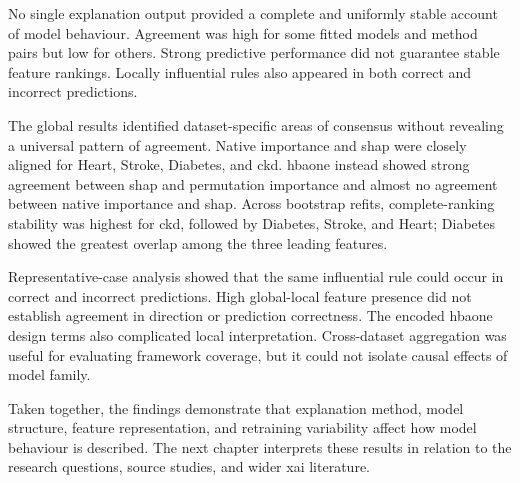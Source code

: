 No single explanation output provided a complete and uniformly stable account of model behaviour. Agreement was high for some fitted models and method pairs but low for others. Strong predictive performance did not guarantee stable feature rankings. Locally influential rules also appeared in both correct and incorrect predictions.

The global results identified dataset-specific areas of consensus without revealing a universal pattern of agreement. Native importance and \gls{shap} were closely aligned for Heart, Stroke, Diabetes, and \gls{ckd}. \gls{hbaone} instead showed strong agreement between \gls{shap} and permutation importance and almost no agreement between native importance and \gls{shap}. Across bootstrap refits, complete-ranking stability was highest for \gls{ckd}, followed by Diabetes, Stroke, and Heart; Diabetes showed the greatest overlap among the three leading features.

Representative-case analysis showed that the same influential rule could occur in correct and incorrect predictions. High global-local feature presence did not establish agreement in direction or prediction correctness. The encoded \gls{hbaone} design terms also complicated local interpretation. Cross-dataset aggregation was useful for evaluating framework coverage, but it could not isolate causal effects of model family.

Taken together, the findings demonstrate that explanation method, model structure, feature representation, and retraining variability affect how model behaviour is described. The next chapter interprets these results in relation to the research questions, source studies, and wider \gls{xai} literature.
